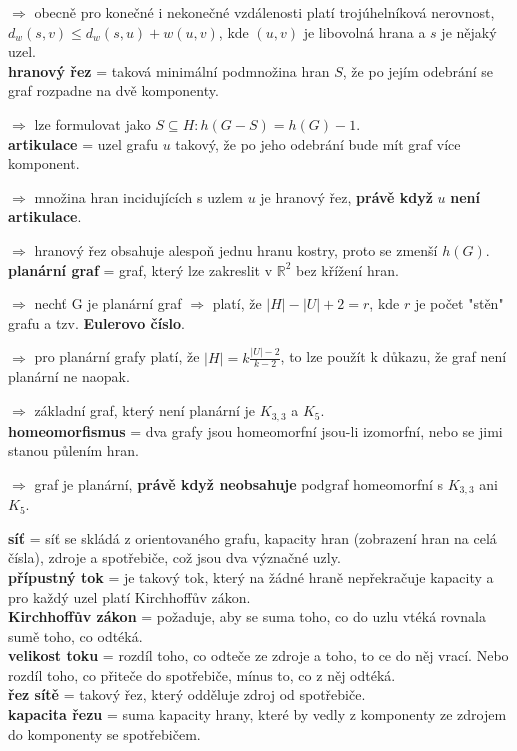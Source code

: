 \documentclass[12pt]{article}
\begin{document}
$\Rightarrow$ obecně pro konečné i nekonečné vzdálenosti platí trojúhelníková nerovnost, $d_w(s, v) \leq d_w(s, u) + w(u, v)$, kde $(u, v)$ je libovolná hrana a $s$ je nějaký uzel.\\

\noindent
\textbf{hranový řez} = taková minimální podmnožina hran $S$, že po jejím odebrání se graf rozpadne na dvě komponenty.

$\Rightarrow$ lze formulovat jako $S \subseteq H: h(G-S) = h(G)-1$.\\
\textbf{artikulace} = uzel grafu $u$ takový, že po jeho odebrání bude mít graf více komponent.

$\Rightarrow$ množina hran incidujících s uzlem $u$ je hranový řez, \textbf{právě když} $u$ \textbf{není artikulace}.

$\Rightarrow$ hranový řez obsahuje alespoň jednu hranu kostry, proto se zmenší $h(G)$.\\


\noindent
\textbf{planární graf} = graf, který lze zakreslit v $\mathbb{R}^2$ bez křížení hran.

$\Rightarrow$ nechť G je planární graf $\Rightarrow$ platí, že $\left|H\right| - \left|U\right| + 2 = r$, kde $r$ je počet "stěn" grafu a tzv. \textbf{Eulerovo číslo}.

$\Rightarrow$ pro planární grafy platí, že $\left|H\right|=k \frac{\left|U\right|-2}{k-2}$, to lze použít k důkazu, že graf není planární ne naopak.

$\Rightarrow$ základní graf, který není planární je $K_{3,3}$ a $K_5$.\\
\textbf{homeomorfismus} = dva grafy jsou homeomorfní jsou-li izomorfní, nebo se jimi stanou půlením hran.

$\Rightarrow$ graf je planární, \textbf{právě když neobsahuje} podgraf homeomorfní s $K_{3,3}$ ani $K_5$.


\noindent
\textbf{síť} = síť se skládá z orientovaného grafu, kapacity hran (zobrazení hran na celá čísla), zdroje a spotřebiče, což jsou dva význačné uzly.\\
\textbf{přípustný tok} = je takový tok, který na žádné hraně nepřekračuje kapacity a pro každý uzel platí Kirchhoffův zákon.\\
\textbf{Kirchhoffův zákon} = požaduje, aby se suma toho, co do uzlu vtéká rovnala sumě toho, co odtéká.\\
\textbf{velikost toku} = rozdíl toho, co odteče ze zdroje a toho, to ce do něj vrací. Nebo rozdíl toho, co přiteče do spotřebiče, mínus to, co z něj odtéká.\\
\textbf{řez sítě} = takový řez, který odděluje zdroj od spotřebiče.\\
\textbf{kapacita řezu} = suma kapacity hrany, které by vedly z komponenty ze zdrojem do komponenty se spotřebičem.
\end{document}
